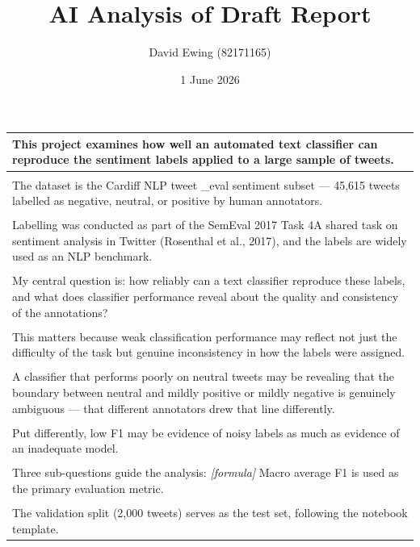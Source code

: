 \documentclass[11pt]{article}
\title{AI Analysis of Draft Report}
\author{David Ewing (82171165)}
\date{1 June 2026}
\begin{document}
\maketitle
\thispagestyle{empty}
\newpage

\begin{longtable}{|p{\dimexpr\linewidth-2\tabcolsep-2\arrayrulewidth\relax}|}
\hline
This project examines how well an automated text classifier can reproduce the sentiment labels applied to a large sample of tweets. \\[2pt]
\hline
\rule{0pt}{3.5cm} \\
\hline
The dataset is the Cardiff NLP tweet \_eval sentiment subset --- 45,615 tweets labelled as negative, neutral, or positive by human annotators. \\[2pt]
\hline
\rule{0pt}{3.5cm} \\
\hline
Labelling was conducted as part of the SemEval 2017 Task 4A shared task on sentiment analysis in Twitter (Rosenthal et al., 2017), and the labels are widely used as an NLP benchmark. \\[2pt]
\hline
\rule{0pt}{3.5cm} \\
\hline
My central question is: how reliably can a text classifier reproduce these labels, and what does classifier performance reveal about the quality and consistency of the annotations? \\[2pt]
\hline
\rule{0pt}{3.5cm} \\
\hline
This matters because weak classification performance may reflect not just the difficulty of the task but genuine inconsistency in how the labels were assigned. \\[2pt]
\hline
\rule{0pt}{3.5cm} \\
\hline
A classifier that performs poorly on neutral tweets may be revealing that the boundary between neutral and mildly positive or mildly negative is genuinely ambiguous --- that different annotators drew that line differently. \\[2pt]
\hline
\rule{0pt}{3.5cm} \\
\hline
Put differently, low F1 may be evidence of noisy labels as much as evidence of an inadequate model. \\[2pt]
\hline
\rule{0pt}{3.5cm} \\
\hline
Three sub-questions guide the analysis: \textit{[formula]} Macro average F1 is used as the primary evaluation metric. \\[2pt]
\hline
\rule{0pt}{3.5cm} \\
\hline
The validation split (2,000 tweets) serves as the test set, following the notebook template. \\[2pt]

\end{longtable}
\end{document}
